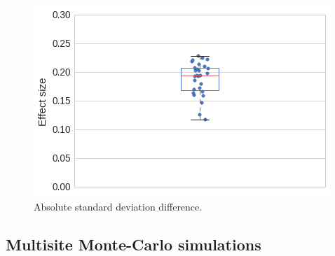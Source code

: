 \documentclass[authoryear]{elsarticle}
\begin{document}
\begin{figure}[htbp]
\begin{center}
\includegraphics[width=\linewidth]{../figures/abs_std_diff.png}
\end{center}
\caption[]{
Absolute standard deviation difference. 
}
\label{fig_site_variability_abs_std_diff}
\end{figure}


\subsection{Multisite Monte-Carlo simulations}
\end{document}
